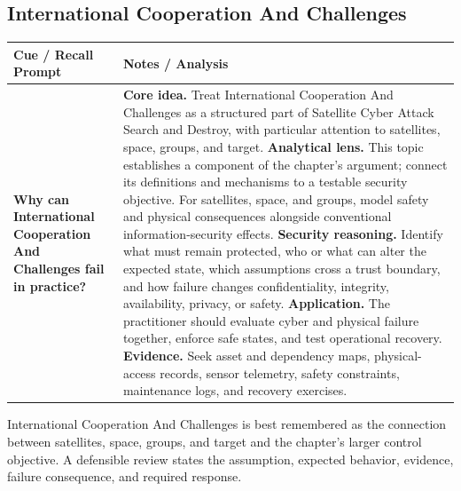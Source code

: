 \documentclass[11pt]{article}
\newcommand{\CornellHeader}{%
\rowcolor{Navy}\color{white}\bfseries Cue / Recall Prompt & \color{white}\bfseries Notes / Analysis\\\hline}
\newcommand{\CornellRow}[2]{%
\cellcolor{CueGray}\RaggedRight\textbf{#1} & \RaggedRight #2\\\hline}
\begin{document}
\subsection*{International Cooperation And Challenges}
\begin{longtable}{>{\RaggedRight\arraybackslash}p{}|>{\RaggedRight\arraybackslash}p{}}
\CornellHeader
\CornellRow{Why can International Cooperation And Challenges fail in practice?}{\textbf{Core idea.} Treat International Cooperation And Challenges as a structured part of Satellite Cyber Attack Search and Destroy, with particular attention to satellites, space, groups, and target. \textbf{Analytical lens.} This topic establishes a component of the chapter's argument; connect its definitions and mechanisms to a testable security objective. For satellites, space, and groups, model safety and physical consequences alongside conventional information-security effects. \textbf{Security reasoning.} Identify what must remain protected, who or what can alter the expected state, which assumptions cross a trust boundary, and how failure changes confidentiality, integrity, availability, privacy, or safety. \textbf{Application.} The practitioner should evaluate cyber and physical failure together, enforce safe states, and test operational recovery. \textbf{Evidence.} Seek asset and dependency maps, physical-access records, sensor telemetry, safety constraints, maintenance logs, and recovery exercises.}
\end{longtable}
\begin{topicsummary}
International Cooperation And Challenges is best remembered as the connection between satellites, space, groups, and target and the chapter's larger control objective. A defensible review states the assumption, expected behavior, evidence, failure consequence, and required response.
\end{topicsummary}
\end{document}

